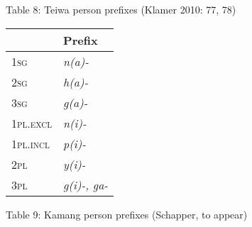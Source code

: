 {\centering
Table 8: Teiwa person prefixes (Klamer 2010: 77, 78)
\par}

\begin{center}
\tablehead{}
\begin{supertabular}{|m{0.90875983in}|m{0.70945984in}|}
\hline
 &
Prefix\\\hline
\scshape 1sg &
\itshape n(a)-\\\hline
\scshape 2sg &
\itshape h(a)-\\\hline
\scshape 3sg &
\itshape g(a)-\\\hline
\scshape 1pl.excl &
\itshape n(i)-\\\hline
\scshape 1pl.incl &
\itshape p(i)-\\\hline
\scshape 2pl &
\itshape y(i)-\\\hline
\scshape 3pl &
\itshape g(i)-, ga-\\\hline
\end{supertabular}
\end{center}
{\centering
Table 9: Kamang person prefixes (Schapper, to appear)
\par}

